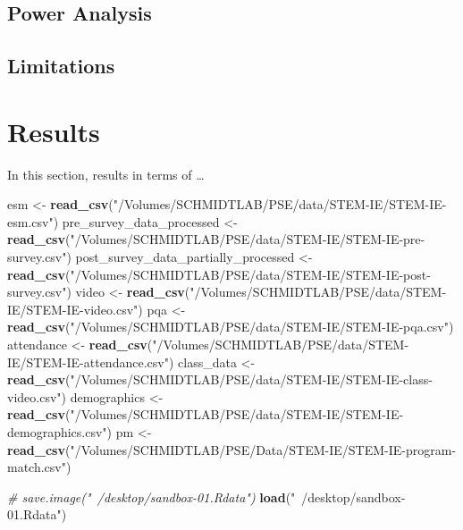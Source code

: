 \documentclass[]{book}
\newenvironment{Shaded}{\begin{snugshade}}{\end{snugshade}}
\newcommand{\KeywordTok}[1]{\textcolor[rgb]{0.13,0.29,0.53}{\textbf{#1}}}
\newcommand{\StringTok}[1]{\textcolor[rgb]{0.31,0.60,0.02}{#1}}
\newcommand{\CommentTok}[1]{\textcolor[rgb]{0.56,0.35,0.01}{\textit{#1}}}
\newcommand{\NormalTok}[1]{#1}
\begin{document}
\section{Power Analysis}\label{power-analysis}

\section{Limitations}\label{limitations}

\chapter{Results}\label{results}

In this section, results in terms of \ldots{}

\begin{Shaded}
\begin{Highlighting}[]
\NormalTok{esm <-}\StringTok{ }\KeywordTok{read_csv}\NormalTok{(}\StringTok{"/Volumes/SCHMIDTLAB/PSE/data/STEM-IE/STEM-IE-esm.csv"}\NormalTok{)}
\NormalTok{pre_survey_data_processed <-}\StringTok{ }\KeywordTok{read_csv}\NormalTok{(}\StringTok{"/Volumes/SCHMIDTLAB/PSE/data/STEM-IE/STEM-IE-pre-survey.csv"}\NormalTok{)}
\NormalTok{post_survey_data_partially_processed <-}\StringTok{ }\KeywordTok{read_csv}\NormalTok{(}\StringTok{"/Volumes/SCHMIDTLAB/PSE/data/STEM-IE/STEM-IE-post-survey.csv"}\NormalTok{)}
\NormalTok{video <-}\StringTok{ }\KeywordTok{read_csv}\NormalTok{(}\StringTok{"/Volumes/SCHMIDTLAB/PSE/data/STEM-IE/STEM-IE-video.csv"}\NormalTok{)}
\NormalTok{pqa <-}\StringTok{ }\KeywordTok{read_csv}\NormalTok{(}\StringTok{"/Volumes/SCHMIDTLAB/PSE/data/STEM-IE/STEM-IE-pqa.csv"}\NormalTok{)}
\NormalTok{attendance <-}\StringTok{ }\KeywordTok{read_csv}\NormalTok{(}\StringTok{"/Volumes/SCHMIDTLAB/PSE/data/STEM-IE/STEM-IE-attendance.csv"}\NormalTok{)}
\NormalTok{class_data <-}\StringTok{ }\KeywordTok{read_csv}\NormalTok{(}\StringTok{"/Volumes/SCHMIDTLAB/PSE/data/STEM-IE/STEM-IE-class-video.csv"}\NormalTok{)}
\NormalTok{demographics <-}\StringTok{ }\KeywordTok{read_csv}\NormalTok{(}\StringTok{"/Volumes/SCHMIDTLAB/PSE/data/STEM-IE/STEM-IE-demographics.csv"}\NormalTok{)}
\NormalTok{pm <-}\StringTok{ }\KeywordTok{read_csv}\NormalTok{(}\StringTok{"/Volumes/SCHMIDTLAB/PSE/Data/STEM-IE/STEM-IE-program-match.csv"}\NormalTok{)}
\end{Highlighting}
\end{Shaded}

\begin{Shaded}
\begin{Highlighting}[]
\CommentTok{# save.image("~/desktop/sandbox-01.Rdata")}
\KeywordTok{load}\NormalTok{(}\StringTok{"~/desktop/sandbox-01.Rdata"}\NormalTok{)}
\end{Highlighting}
\end{Shaded}
\end{document}

